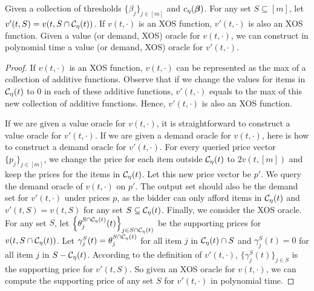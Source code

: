  \begin{lemma}\label{lem:truncated still XOS and oracle}
 	Given a collection of thresholds $\{\beta_j\}_{j\in[m]}$ and $c_{\eta}(\boldsymbol{\beta})$. %
 	For any set $S\subseteq[m]$, let $v'(t,S) = v(t,S\cap {\mathcal{C}}_{\eta}(t))$. If $v(t,\cdot)$ is an XOS function, $v'(t,\cdot)$ is also an XOS function. Given a value (or demand, XOS) oracle for $v(t,\cdot)$, we can construct in polynomial time a value (or demand, XOS) oracle for $v'(t,\cdot)$.
 \end{lemma}			 
 	\begin{proof}
 		If $v(t,\cdot)$ is an XOS function, $v(t,\cdot)$ can be represented as the max of a collection of additive functions. Observe that if we change the values for items in ${\mathcal{C}}_{\eta}(t)$ to $0$ in each of these additive functions, $v'(t,\cdot)$ equals to the max of this new collection of additive functions. Hence, $v'(t,\cdot)$ is also an XOS function.
 		
 		If we are given a value oracle for $v(t,\cdot)$, it is straightforward to construct a value oracle for $v'(t,\cdot)$.
 		 If we are given a demand oracle for $v(t,\cdot)$, here is how to construct a demand oracle for $v'(t,\cdot)$. 
 		 For every queried price vector $\{p_j\}_{j\in[m]}$, we change the price for each item outside ${\mathcal{C}}_{\eta}(t)$ to $2v(t,[m])$ and keep the prices for the items in ${\mathcal{C}}_{\eta}(t)$. 
 		 Let this new price vector be $p'$. We query the demand oracle of $v(t,\cdot)$ on $p'$. 
 		 The output set should also be the demand set for $v'(t,\cdot)$ under prices $p$, as the bidder can only afford items in ${\mathcal{C}}_{\eta}(t)$ and $v'(t,S)=v(t,S)$ for any set $S\subseteq {\mathcal{C}}_{\eta}(t)$. 
 		 Finally, we consider the XOS oracle. %
 		 For any set $S$, let $\left\{\theta^{S\cap {\mathcal{C}}_\eta(t)}_j(t)\right\}_{j\in {S\cap {\mathcal{C}}_\eta(t)}}$ be the supporting prices for %
 		   $v(t,{S\cap {\mathcal{C}}_\eta(t)})$. %
 		   Let $\gamma^{S}_j(t)=\theta^{S\cap {\mathcal{C}}_\eta(t)}_j$ for all item $j$ in ${\mathcal{C}}_\eta(t)\cap S$ and  $\gamma^{S}_j(t)=0$ for all item $j$ in $S-{\mathcal{C}}_\eta(t)$. According to the definition of $v'(t,\cdot)$, $\{\gamma_j^S(t)\}_{j\in S}$ is the supporting price for $v'(t,S)$. So given an XOS oracle for $v(t,\cdot)$, we can compute the supporting price of any set $S$ for $v'(t,\cdot)$ in polynomial time.
 	\end{proof}	
 	
